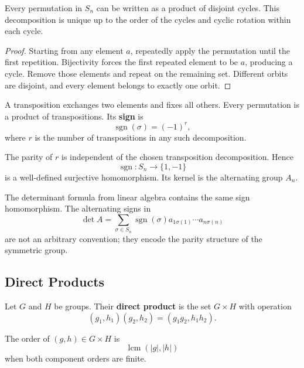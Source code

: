 \begin{theorem}
Every permutation in $S_n$ can be written as a product of disjoint cycles. This decomposition is unique up to the order of the cycles and cyclic rotation within each cycle.
\end{theorem}

\begin{proof}
Starting from any element $a$, repeatedly apply the permutation until the first repetition. Bijectivity forces the first repeated element to be $a$, producing a cycle. Remove those elements and repeat on the remaining set. Different orbits are disjoint, and every element belongs to exactly one orbit.
\end{proof}

\begin{definition}
A transposition exchanges two elements and fixes all others. Every permutation is a product of transpositions. Its \textbf{sign} is
\[
    \operatorname{sgn}(\sigma)=(-1)^r,
\]
where $r$ is the number of transpositions in any such decomposition.
\end{definition}

\begin{theorem}
The parity of $r$ is independent of the chosen transposition decomposition. Hence
\[
    \operatorname{sgn}:S_n\to\{1,-1\}
\]
is a well-defined surjective homomorphism. Its kernel is the alternating group $A_n$.
\end{theorem}

\begin{remark}
The determinant formula from linear algebra contains the same sign homomorphism. The alternating signs in
\[
    \det A=\sum_{\sigma\in S_n}\operatorname{sgn}(\sigma)
    a_{1\sigma(1)}\cdots a_{n\sigma(n)}
\]
are not an arbitrary convention; they encode the parity structure of the symmetric group.
\end{remark}

\subsection{Direct Products}

\begin{definition}
Let $G$ and $H$ be groups. Their \textbf{direct product} is the set $G\times H$ with operation
\[
    (g_1,h_1)(g_2,h_2)=(g_1g_2,h_1h_2).
\]
\end{definition}

\begin{proposition}
The order of $(g,h)\in G\times H$ is
\[
    \operatorname{lcm}(|g|,|h|)
\]
when both component orders are finite.
\end{proposition}

